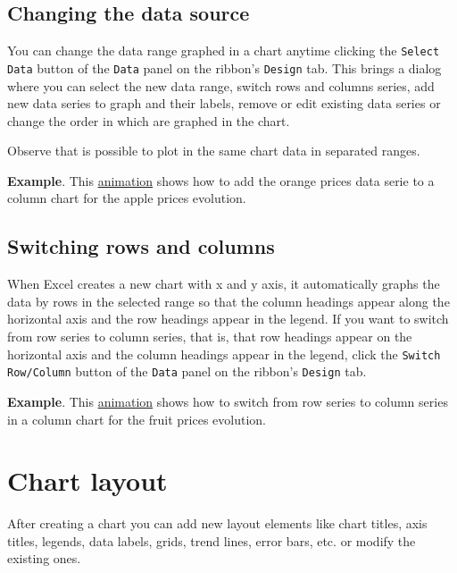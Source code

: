 \subsection{Changing the data source}\hypertarget{changing-the-data-source}{}\label{changing-the-data-source}

You can change the data range graphed in a chart anytime clicking the \texttt{Select Data} button of the \texttt{Data} panel on the ribbon's \texttt{Design} tab. This brings a dialog where you can select the new data range, switch rows and columns series, add new data series to graph and their labels, remove or edit existing data series or change the order in which are graphed in the chart.

Observe that is possible to plot in the same chart data in separated ranges.

\textbf{Example}. This \href{http://aprendeconalf.es/office/excel/manual/img/example_chart_add_data_serie.gif}{animation} shows how to add the orange prices data serie to a column chart for the apple prices evolution.

\subsection{Switching rows and columns}\hypertarget{switching-rows-and-columns}{}\label{switching-rows-and-columns}

When Excel creates a new chart with x and y axis, it automatically graphs the data by rows in the selected range so that the column headings appear along the horizontal axis and the row headings appear in the legend. If you want to switch from row series to column series, that is, that row headings appear on the horizontal axis and the column headings appear in the legend, click the \texttt{Switch Row/Column} button of the \texttt{Data} panel on the ribbon's \texttt{Design} tab.

\textbf{Example}. This \href{http://aprendeconalf.es/office/excel/manual/img/example_chart_switch_row_column.gif}{animation} shows how to switch from row series to column series in a column chart for the fruit prices evolution.

\section{Chart layout}\hypertarget{chart-layout}{}\label{chart-layout}

After creating a chart you can add new layout elements like chart titles, axis titles, legends, data labels, grids, trend lines, error bars, etc. or modify the existing ones.

